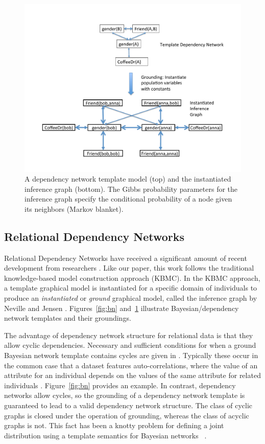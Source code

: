 \documentclass[runningheads,a4paper]{llncs}
\begin{document}
\begin{figure}[htbp]
\begin{center}
\includegraphics[width = 0.7 \textwidth]{figures/dn}
\caption{A dependency network template model (top) and the instantiated inference graph (bottom). The Gibbs probability parameters for the inference graph specify the conditional probability of a node given its neighbors (Markov blanket). \label{fig:dn}}
\end{center}
\end{figure}

 
\subsection{Relational Dependency Networks} Relational Dependency Networks have received a significant amount of recent development from researchers \cite{Neville2007,Natarajan2012}. Like our paper, this work follows the traditional knowledge-based model construction approach (KBMC). In the KBMC approach, a template graphical model is instantiated for a specific domain of individuals to produce an {\em  instantiated} or {\em ground} graphical model, called the inference graph by Neville and Jensen \cite{Neville2007}. Figures~\ref{fig:bn} and~\ref{fig:dn} illustrate Bayesian/dependency network templates and their groundings.

The advantage of dependency network structure for relational data is that they allow cyclic dependencies. Necessary and sufficient conditions for when a ground Bayesian network template contains cycles are given in \cite{Schulte2012a}.  Typically these occur in the common case that a dataset features auto-correlations, where the value of an attribute for an individual depends on the values of the same attribute for related individuals \cite{Neville2007}. Figure~\ref{fig:bn}  provides an example. In contrast, dependency networks allow cycles, so the grounding of a dependency network template is guaranteed to lead to a valid dependency network structure. The class of cyclic graphs is closed under the operation of grounding, whereas the class of acyclic graphs is not. This fact has been a knotty problem for defining a joint distribution using a template semantics for Bayesian networks ~\cite{Domingos2007,Taskar2002,Getoor2007c}. 
\end{document}
